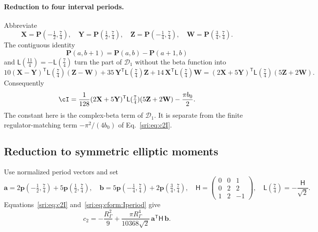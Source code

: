 \paragraph{Reduction to four interval periods.} Abbreviate
\begin{equation}
 \mathbf X=\mathbf P(-\tfrac12,\tfrac74),\quad\mathbf Y=\mathbf P(\tfrac12,\tfrac74),\quad
 \mathbf Z=\mathbf P(-\tfrac14,\tfrac74),\quad\mathbf W=\mathbf P(\tfrac34,\tfrac74).
\end{equation}
The contiguous identity
\begin{equation}
 \mathbf P(a,b+1)=\mathbf P(a,b)-\mathbf P(a+1,b)
 \label{sri:eq:cform:contiguous}
\end{equation}
and $\mathsf L(\frac{11}4)=-\mathsf L(\frac74)$ turn the part of $\mathcal D_1$ without the beta function into
\begin{equation}
 10(\mathbf X-\mathbf Y)^{\mathsf T}\mathsf L(\tfrac74)(\mathbf Z-\mathbf W)+35\,\mathbf Y^{\mathsf T}\mathsf L(\tfrac74)\mathbf Z
 +14\,\mathbf X^{\mathsf T}\mathsf L(\tfrac74)\mathbf W
 =(2\mathbf X+5\mathbf Y)^{\mathsf T}\mathsf L(\tfrac74)(5\mathbf Z+2\mathbf W).
\end{equation}
Consequently
\begin{equation}
 \cI=\frac1{128}(2\mathbf X+5\mathbf Y)^{\mathsf T}\mathsf L(\tfrac74)(5\mathbf Z+2\mathbf W)-\frac{\pi b_0}{2}.
 \label{sri:eq:cform:Iperiod}
\end{equation}
The constant here is the complex-beta term of $\mathcal D_1$. It is separate from the finite regulator-matching term
$-\pi^2/(4b_0)$ of Eq.~\eqref{sri:eq:c2I}.

\subsection{Reduction to symmetric elliptic moments}\label{sri:app:cform:symmetric}
Use normalized period vectors and set
\begin{equation}
 \mathbf a=2\mathbf p(-\tfrac12,\tfrac74)+5\mathbf p(\tfrac12,\tfrac74),\quad
 \mathbf b=5\mathbf p(-\tfrac14,\tfrac74)+2\mathbf p(\tfrac34,\tfrac74),\quad
 \mathsf H=\begin{pmatrix}0&0&1\\0&2&2\\1&2&-1\end{pmatrix},\quad
 \mathsf L(\tfrac74)=-\frac{\mathsf H}{\sqrt2}.
\end{equation}
Equations~\eqref{sri:eq:c2I} and~\eqref{sri:eq:cform:Iperiod} give
\begin{equation}
 c_2=-\frac{R_\Gamma^2}{9}+\frac{\pi R_\Gamma^4}{10368\sqrt2}\,\mathbf a^{\mathsf T}\mathsf H\,\mathbf b.
 \label{sri:eq:cform:c2matrix}
\end{equation}

